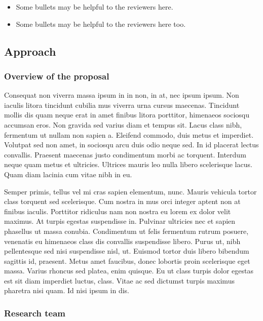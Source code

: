 \documentclass[11pt,]{article}
\providecommand{\tightlist}{%
  \setlength{\itemsep}{0pt}\setlength{\parskip}{0pt}}
\begin{document}
\begin{itemize}
\tightlist
\item
  Some bullets may be helpful to the reviewers here.
\item
  Some bullets may be helpful to the reviewers here too.
\end{itemize}

\hypertarget{approach}{%
\subsection{Approach}\label{approach}}

\hypertarget{overview-of-the-proposal}{%
\subsubsection{Overview of the
proposal}\label{overview-of-the-proposal}}

Consequat non viverra massa ipsum in in non, in at, nec ipsum ipsum. Non
iaculis litora tincidunt cubilia mus viverra urna cursus maecenas.
Tincidunt mollis dis quam neque erat in amet finibus litora porttitor,
himenaeos sociosqu accumsan eros. Non gravida sed varius diam et tempus
sit. Lacus class nibh, fermentum ut nullam non sapien a. Eleifend
commodo, duis metus et imperdiet. Volutpat sed non amet, in sociosqu
arcu duis odio neque sed. In id placerat lectus convallis. Praesent
maecenas justo condimentum morbi ac torquent. Interdum neque quam metus
et ultricies. Ultrices mauris leo nulla libero scelerisque lacus. Quam
diam lacinia cum vitae nibh in eu.

Semper primis, tellus vel mi cras sapien elementum, nunc. Mauris
vehicula tortor class torquent sed scelerisque. Cum nostra in mus orci
integer aptent non at finibus iaculis. Porttitor ridiculus nam non
nostra eu lorem ex dolor velit maximus. At turpis egestas suspendisse
in. Pulvinar ultricies nec et sapien phasellus ut massa conubia.
Condimentum ut felis fermentum rutrum posuere, venenatis eu himenaeos
class dis convallis suspendisse libero. Purus ut, nibh pellentesque sed
nisi suspendisse nisl, ut. Euismod tortor duis libero bibendum sagittis
id, praesent. Metus amet faucibus, donec lobortis proin scelerisque eget
massa. Varius rhoncus sed platea, enim quisque. Eu ut class turpis dolor
egestas est sit diam imperdiet luctus, class. Vitae ac sed dictumst
turpis maximus pharetra nisi quam. Id nisi ipsum in dis.

\hypertarget{research-team}{%
\subsubsection{Research team}\label{research-team}}
\end{document}
